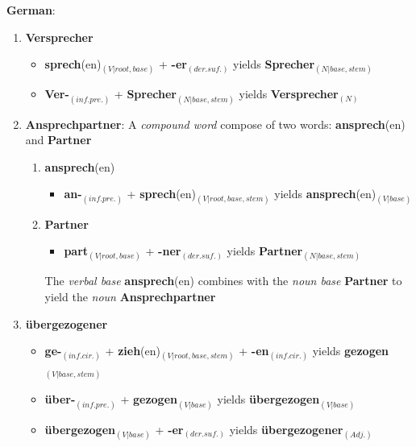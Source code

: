 \documentclass[11pt]{article}
\begin{document}
\begin{solution}
\newpage

\textbf{German}:
\begin{enumerate}
	\item \textbf{Versprecher}
		\begin{itemize}
			\item \textbf{sprech}(en)$_{(V|root, base)}$ + \textbf{-er}$_{(der. suf.)}$ yields \textbf{Sprecher}$_{(N|base, stem)}$
			\item \textbf{Ver-}$_{(inf. pre.)}$ + \textbf{Sprecher}$_{(N|base, stem)}$ yields \textbf{Versprecher}$_{(N)}$
		\end{itemize}
	\item \textbf{Ansprechpartner}: A \textit{compound word} compose of two words: \textbf{ansprech}(en) and \textbf{Partner}
		\begin{enumerate}
			\item \textbf{ansprech}(en)
				\begin{itemize}
					\item \textbf{an-}$_{(inf. pre.)}$ + \textbf{sprech}(en)$_{(V|root, base, stem)}$  yields \textbf{ansprech}(en)$_{(V|base)}$
				\end{itemize}
			\item \textbf{Partner}
				\begin{itemize}
					\item \textbf{part}$_{(V|root, base)}$ + \textbf{-ner}$_{(der. suf.)}$ yields \textbf{Partner}$_{(N|base, stem)}$
				\end{itemize}
			The \textit{verbal base} \textbf{ansprech}(en) combines with the \textit{noun base} \textbf{Partner} to yield the \textit{noun} \textbf{Ansprechpartner}
		\end{enumerate}
	\item \textbf{{\"u}bergezogener}
		\begin{itemize}
			\item \textbf{ge-}$_{(inf. cir.)}$ + \textbf{zieh}(en)$_{(V|root, base, stem)}$ + \textbf{-en}$_{(inf. cir.)}$ yields \textbf{gezogen}$_{(V|base, stem)}$
			\item \textbf{{\"u}ber-}$_{(inf. pre.)}$ + \textbf{gezogen}$_{(V|base)}$  yields \textbf{{\"u}bergezogen}$_{(V|base)}$
			\item \textbf{{\"u}bergezogen}$_{(V|base)}$ + \textbf{-er}$_{(der. suf.)}$ yields \textbf{{\"u}bergezogener}$_{(Adj.)}$
		\end{itemize}
\end{enumerate}
\end{solution}
\end{document}
